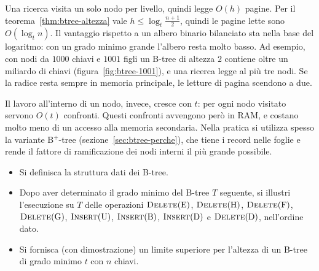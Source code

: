 Una ricerca visita un solo nodo per livello, quindi legge $O(h)$ pagine. Per il teorema~\ref{thm:btree-altezza} vale $h \le \log_t \frac{n+1}{2}$, quindi le pagine lette sono $O(\log_t n)$. Il vantaggio rispetto a un albero binario bilanciato sta nella base del logaritmo: con un grado minimo grande l'albero resta molto basso. Ad esempio, con nodi da $1000$ chiavi e $1001$ figli un B-tree di altezza $2$ contiene oltre un miliardo di chiavi (figura~\ref{fig:btree-1001}), e una ricerca legge al più tre nodi. Se la radice resta sempre in memoria principale, le letture di pagina scendono a due.

Il lavoro all'interno di un nodo, invece, cresce con $t$: per ogni nodo visitato servono $O(t)$ confronti. Questi confronti avvengono però in RAM, e costano molto meno di un accesso alla memoria secondaria. Nella pratica si utilizza spesso la variante B$^+$-tree (sezione~\ref{sec:btree-perche}), che tiene i record nelle foglie e rende il fattore di ramificazione dei nodi interni il più grande possibile.

\begin{esercizio}\label{es:btree-2018}
\begin{itemize}
    \item[(a)] Si definisca la struttura dati dei B-tree.
    \item[(b)] Dopo aver determinato il grado minimo del B-tree $T$ seguente, si illustri l'esecuzione su $T$ delle operazioni $\textsc{Delete}(\mathrm{E})$, $\textsc{Delete}(\mathrm{H})$, $\textsc{Delete}(\mathrm{F})$, $\textsc{Delete}(\mathrm{G})$, $\textsc{Insert}(\mathrm{U})$, $\textsc{Insert}(\mathrm{B})$, $\textsc{Insert}(\mathrm{D})$ e $\textsc{Delete}(\mathrm{D})$, nell'ordine dato.
    \item[(c)] Si fornisca (con dimostrazione) un limite superiore per l'altezza di un B-tree di grado minimo $t$ con $n$ chiavi.
\end{itemize}
\begin{center}
\end{center}
\end{esercizio}

